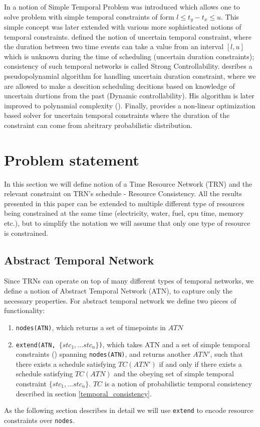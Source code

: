 \documentclass{article}
\begin{document}
\begin{multicols}{2}
In \cite{dechter1991temporal} a notion of Simple Temporal Problem was introduced which allows one to solve problem with simple temporal constraints of form $l \leq t_y - t_x \leq u$. This simple concept was later extended with various more sophisticated notions of temporal constraints. \cite{vidal1996dealing} defined the notion of uncertain temporal constraint, where the duration between two time events can take a value from an interval $[l,u]$ which is unknown during the time of scheduling (uncertain duration constraints); consistency of such temporal networks is called Strong Controllability. \cite{morris2001dynamic} desribes a pseudopolynamial algorithm for handling uncertain duration constraint, where we are allowed to make a descition scheduling decitions based on knowledge of uncertain durtions from the past (Dynamic controllability). His algorithm is later improved to polynamial complexity (\cite{morris2005temporal}). Finally, \cite{Fang2014} provides a non-linear optimization based solver for uncertain temporal constraints where the duration of the constraint can come from abritrary probabilistic distribution.

\section{Problem statement}
In this section we will define notion of a Time Resource Network (TRN) and the relevant constraint on TRN's schedule - Resource Consistency. All the results presented in this paper can be extended to multiple different type of resources being constrained at the same time (electricity, water, fuel, cpu time, memory etc.), but to simplify the notation we will assume that only one type of resource is constrained.
\subsection{Abstract Temporal Network}
Since TRNs can operate on top of many different types of temporal networks, we define a notion of Abstract Temporal Network (ATN), to capture only the necessary properties. For abstract temporal network we define two pieces of functionality:
\begin{enumerate}
\item \texttt{nodes(ATN)}, which returns a set of timepoints in $ATN$
\item \texttt{extend(ATN, $\{ stc_1, ... stc_n \} $)}, which takes ATN and a set of simple temporal constraints (\cite{dechter1991temporal}) spanning \texttt{nodes(ATN)}, and returns another $ATN'$, such that there exists a schedule satisfying $TC(ATN')$ if and only if there exists a schedule satisfying $TC(ATN)$ and the obeying set of simple temporal constraint $\{ stc_1, ... stc_n \} $. $TC$ is a notion of probabilistic temporal consistency described in section \ref{temporal_consistency}.
\end{enumerate}
As the following section describes in detail we will use \texttt{extend} to encode resource constraints over \texttt{nodes}.

\end{multicols}
\end{document}
